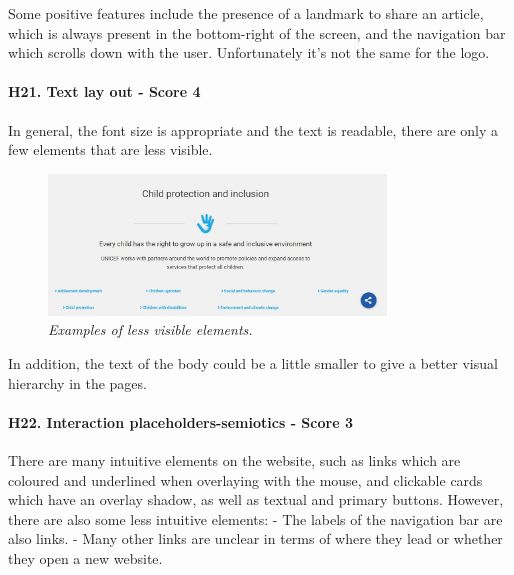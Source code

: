 \newline Some positive features include the presence of a landmark to share an article, which is always present in the bottom-right of the screen, and the navigation bar which scrolls down with the user. Unfortunately it’s not the same for the logo.
\newline
\newline \paragraph{H21. Text lay out - Score 4}  \label{subsec:H21}	In general, the font size is appropriate and the text is readable, there are only a few elements that are less visible.
\begin{figure}[!h]
	\begin{center}
		\includegraphics[width=0.8\textwidth]{FinalScores24.jpg}
		\captionsetup{font=small}
		\caption{\textit{Examples of less visible elements.}}
	\end{center}
\end{figure}
\newline In addition, the text of the body could be a little smaller to give a better visual hierarchy in the pages.
\newline
\newline \paragraph{H22. Interaction placeholders-semiotics - Score 3}  \label{subsec:H22}	There are many intuitive elements on the website, such as links which are coloured and underlined when overlaying with the mouse, and clickable cards which have an overlay shadow, as well as textual and primary buttons.
\newline However, there are also some less intuitive elements:
\newline -	The labels of the navigation bar are also links.
\newline -	Many other links are unclear in terms of where they lead or whether they open a new website.
